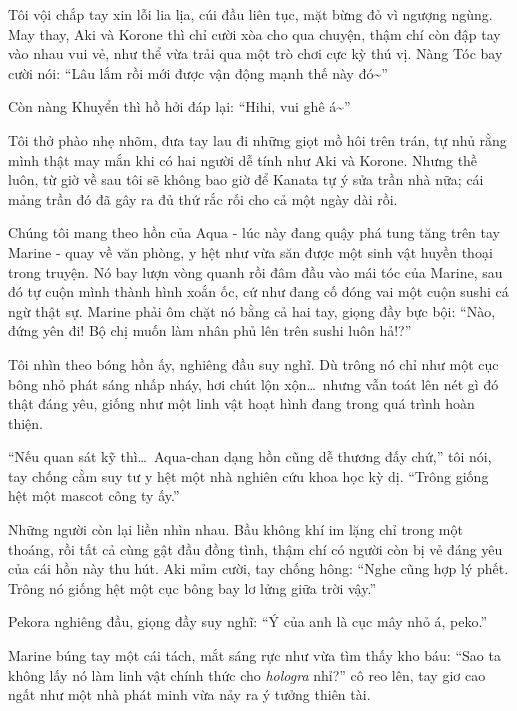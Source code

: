 \documentclass[../main.tex]{subfiles}
\begin{document}
Tôi vội chắp tay xin lỗi lia lịa, cúi đầu liên tục, mặt bừng đỏ vì ngượng ngùng. May thay, Aki và Korone thì chỉ cười xòa cho qua chuyện, thậm chí còn đập tay vào nhau vui vẻ, như thể vừa trải qua một trò chơi cực kỳ thú vị. Nàng Tóc bay cười nói: ``Lâu lắm rồi mới được vận động mạnh thế này đó\~{}''

Còn nàng Khuyển thì hồ hởi đáp lại: ``Hihi, vui ghê á\~{}''

Tôi thở phào nhẹ nhõm, đưa tay lau đi những giọt mồ hôi trên trán, tự nhủ rằng mình thật may mắn khi có hai người dễ tính như Aki và Korone. Nhưng thề luôn, từ giờ về sau tôi sẽ không bao giờ để Kanata tự ý sửa trần nhà nữa; cái mảng trần đó đã gây ra đủ thứ rắc rối cho cả một ngày dài rồi.


\omk

Chúng tôi mang theo hồn của Aqua - lúc này đang quậy phá tung tăng trên tay Marine - quay về văn phòng, y hệt như vừa săn được một sinh vật huyền thoại trong truyện. Nó bay lượn vòng quanh rồi đâm đầu vào mái tóc của Marine, sau đó tự cuộn mình thành hình xoắn ốc, cứ như đang cố đóng vai một cuộn sushi cá ngừ thật sự. Marine phải ôm chặt nó bằng cả hai tay, giọng đầy bực bội: ``Nào, đứng yên đi! Bộ chị muốn làm nhân phủ lên trên sushi luôn hả!?''

Tôi nhìn theo bóng hồn ấy, nghiêng đầu suy nghĩ. Dù trông nó chỉ như một cục bông nhỏ phát sáng nhấp nháy, hơi chút lộn xộn\dots\ nhưng vẫn toát lên nét gì đó thật đáng yêu, giống như một linh vật hoạt hình đang trong quá trình hoàn thiện.

``Nếu quan sát kỹ thì\dots\ Aqua-chan dạng hồn cũng dễ thương đấy chứ,'' tôi nói, tay chống cằm suy tư y hệt một nhà nghiên cứu khoa học kỳ dị. ``Trông giống hệt một mascot công ty ấy.''


Những người còn lại liền nhìn nhau. Bầu không khí im lặng chỉ trong một thoáng, rồi tất cả cùng gật đầu đồng tình, thậm chí có người còn bị vẻ đáng yêu của cái hồn này thu hút. Aki mỉm cười, tay chống hông: ``Nghe cũng hợp lý phết. Trông nó giống hệt một cục bông bay lơ lửng giữa trời vậy.''

Pekora nghiêng đầu, giọng đầy suy nghĩ: ``Ý của anh là cục mây nhỏ á, peko.''

Marine búng tay một cái tách, mắt sáng rực như vừa tìm thấy kho báu: ``Sao ta không lấy nó làm linh vật chính thức cho \textit{hologra} nhỉ?'' cô reo lên, tay giơ cao ngất như một nhà phát minh vừa nảy ra ý tưởng thiên tài.
\end{document}
